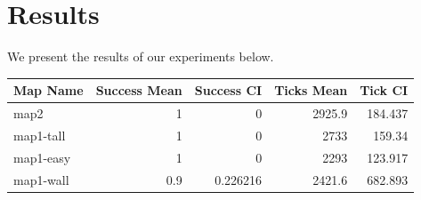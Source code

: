 \documentclass[conference]{IEEEtran}
\begin{document}
\section{Results} \label{sec:Experiments}
We present the results of our experiments below.

\begin{table}
	\begin{tabular}{lrrrr}
\hline
 Map Name   &   Success Mean &   Success CI &   Ticks Mean &   Tick CI \\
\hline
 map2       &            1   &     0        &       2925.9 &   184.437 \\
 map1-tall  &            1   &     0        &       2733   &   159.34  \\
 map1-easy  &            1   &     0        &       2293   &   123.917 \\
 map1-wall  &            0.9 &     0.226216 &       2421.6 &   682.893 \\
\hline
\end{tabular}
\end{table}







       


\end{document}
